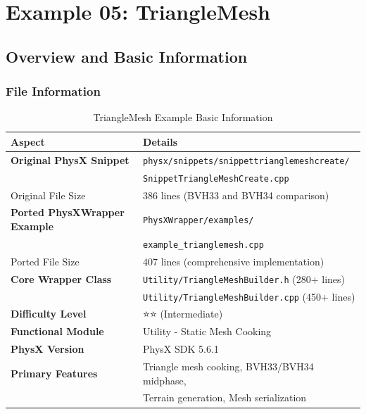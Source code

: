 
\section{Example 05: TriangleMesh}

\subsection{Overview and Basic Information}

\subsubsection{File Information}

\begin{table}[h]
\centering
\begin{tabular}{|l|l|}
\hline
\textbf{Aspect} & \textbf{Details} \\
\hline
\textbf{Original PhysX Snippet} & \texttt{physx/snippets/snippettrianglemeshcreate/} \\
 & \texttt{SnippetTriangleMeshCreate.cpp} \\
\hline
Original File Size & 386 lines (BVH33 and BVH34 comparison) \\
\hline
\textbf{Ported PhysXWrapper Example} & \texttt{PhysXWrapper/examples/} \\
 & \texttt{example\_trianglemesh.cpp} \\
\hline
Ported File Size & 407 lines (comprehensive implementation) \\
\hline
\textbf{Core Wrapper Class} & \texttt{Utility/TriangleMeshBuilder.h} (280+ lines) \\
 & \texttt{Utility/TriangleMeshBuilder.cpp} (450+ lines) \\
\hline
\textbf{Difficulty Level} & ⭐⭐ (Intermediate) \\
\hline
\textbf{Functional Module} & Utility - Static Mesh Cooking \\
\hline
\textbf{PhysX Version} & PhysX SDK 5.6.1 \\
\hline
\textbf{Primary Features} & Triangle mesh cooking, BVH33/BVH34 midphase, \\
 & Terrain generation, Mesh serialization \\
\hline
\end{tabular}
\caption{TriangleMesh Example Basic Information}
\end{table}

